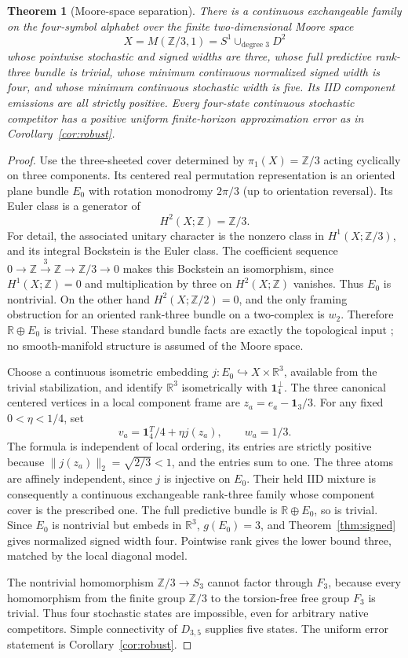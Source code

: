 \documentclass[11pt]{article}
\newtheorem{theorem}{Theorem}
\theoremstyle{remark}\newtheorem{remark}[theorem]{Remark}
\newcommand{\R}{\mathbb R}
\newcommand{\one}{\mathbf 1}
\begin{document}
\begin{theorem}[Moore-space separation]\label{thm:moore}
There is a continuous exchangeable family on the four-symbol alphabet over the finite two-dimensional Moore space
\[
 X=M(\mathbb Z/3,1)=S^1\cup_{\text{degree }3}D^2
\]
whose pointwise stochastic and signed widths are three, whose full predictive rank-three bundle is trivial, whose minimum continuous normalized signed width is four, and whose minimum continuous stochastic width is five. Its IID component emissions are all strictly positive. Every four-state continuous stochastic competitor has a positive uniform finite-horizon approximation error as in Corollary~\ref{cor:robust}.
\end{theorem}
\begin{proof}
Use the three-sheeted cover determined by $\pi_1(X)=\mathbb Z/3$ acting cyclically on three components. Its centered real permutation representation is an oriented plane bundle $E_0$ with rotation monodromy $2\pi/3$ (up to orientation reversal). Its Euler class is a generator of
\[
 H^2(X;\mathbb Z)=\mathbb Z/3.
\]
For detail, the associated unitary character is the nonzero class in $H^1(X;\mathbb Z/3)$, and its integral Bockstein is the Euler class. The coefficient sequence $0\to\mathbb Z\xrightarrow{3}\mathbb Z\to\mathbb Z/3\to0$ makes this Bockstein an isomorphism, since $H^1(X;\mathbb Z)=0$ and multiplication by three on $H^2(X;\mathbb Z)$ vanishes. Thus $E_0$ is nontrivial. On the other hand $H^2(X;\mathbb Z/2)=0$, and the only framing obstruction for an oriented rank-three bundle on a two-complex is $w_2$. Therefore $\R\oplus E_0$ is trivial. These standard bundle facts are exactly the topological input \cite{Hatcher}; no smooth-manifold structure is assumed of the Moore space.

Choose a continuous isometric embedding $j:E_0\hookrightarrow X\times\R^3$, available from the trivial stabilization, and identify $\R^3$ isometrically with $\one_4^\perp$. The three canonical centered vertices in a local component frame are $z_a=e_a-\one_3/3$. For any fixed $0<\eta<1/4$, set
\[
 v_a=\one_4^T/4+\eta j(z_a),\qquad w_a=1/3.
\]
The formula is independent of local ordering, its entries are strictly positive because $\|j(z_a)\|_2=\sqrt{2/3}<1$, and the entries sum to one. The three atoms are affinely independent, since $j$ is injective on $E_0$. Their held IID mixture is consequently a continuous exchangeable rank-three family whose component cover is the prescribed one. The full predictive bundle is $\R\oplus E_0$, so is trivial. Since $E_0$ is nontrivial but embeds in $\R^3$, $g(E_0)=3$, and Theorem~\ref{thm:signed} gives normalized signed width four. Pointwise rank gives the lower bound three, matched by the local diagonal model.

The nontrivial homomorphism $\mathbb Z/3\to S_3$ cannot factor through $F_3$, because every homomorphism from the finite group $\mathbb Z/3$ to the torsion-free free group $F_3$ is trivial. Thus four stochastic states are impossible, even for arbitrary native competitors. Simple connectivity of $D_{3,5}$ supplies five states. The uniform error statement is Corollary~\ref{cor:robust}.
\end{proof}
\end{document}
